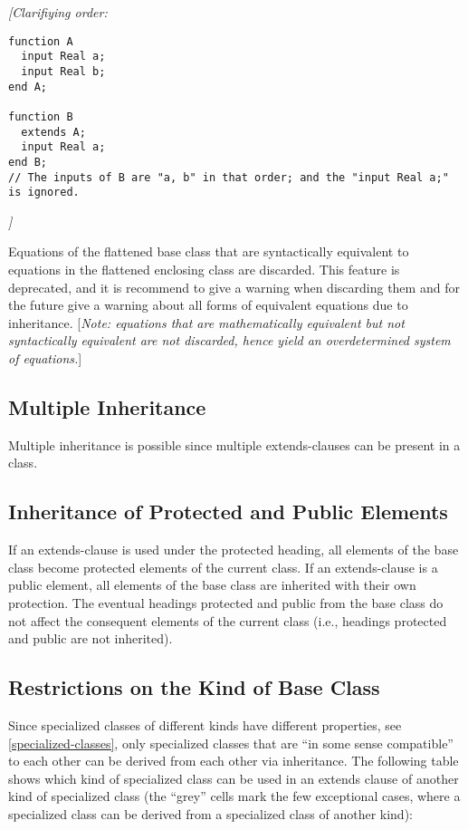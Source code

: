 \emph{{[}Clarifiying order:}
\begin{lstlisting}[language=modelica]
function A
  input Real a;
  input Real b;
end A;

function B
  extends A;
  input Real a;
end B;
// The inputs of B are "a, b" in that order; and the "input Real a;" is ignored.
\end{lstlisting}
\emph{{]}}

Equations of the flattened base class that are syntactically equivalent
to equations in the flattened enclosing class are discarded. This
feature is deprecated, and it is recommend to give a warning when
discarding them and for the future give a warning about all forms of
equivalent equations due to inheritance. {[}\emph{Note: equations that
are mathematically equivalent but not syntactically equivalent are not
discarded, hence yield an overdetermined system of equations.}{]}

\subsection{Multiple Inheritance}

Multiple inheritance is possible since multiple extends-clauses can be
present in a class.

\subsection{Inheritance of Protected and Public Elements}

If an extends-clause is used under the protected heading, all elements
of the base class become protected elements of the current class. If an
extends-clause is a public element, all elements of the base class are
inherited with their own protection. The eventual headings protected and
public from the base class do not affect the consequent elements of the
current class (i.e., headings protected and public are not inherited).

\subsection{Restrictions on the Kind of Base Class}

Since specialized classes of different kinds have different properties,
see \ref{specialized-classes}, only specialized classes that are ``in some sense
compatible'' to each other can be derived from each other via
inheritance. The following table shows which kind of specialized class
can be used in an extends clause of another kind of specialized class
(the ``grey'' cells mark the few exceptional cases, where a specialized
class can be derived from a specialized class of another kind):

